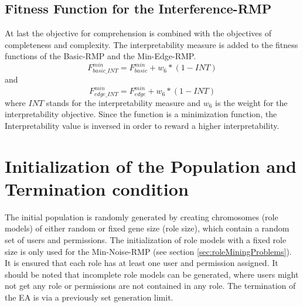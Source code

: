         \subsection{Fitness Function for the Interference-RMP}
        At last the objective for comprehension is combined with the objectives of completeness and complexity. The interpretability measure is added to the fitness functions of the Basic-RMP and the Min-Edge-RMP.        
        \begin{equation}\label{eq:FBasicMin_INT}
	        F_{basic\_INT}^{min} = F_{basic}^{min} + w_6 * (1-INT)
	    \end{equation}	    
	    and	    
	    \begin{equation}\label{eq:FEdgeMin_INT}
		    F_{edge\_INT}^{min} = F_{edge}^{min} + w_6 * (1-INT)
		\end{equation}		
		where $INT$ stands for the interpretability measure and $w_6$ is the weight for the interpretability objective. Since the function is a minimization function, the Interpretability value is inversed in order to reward a higher interpretability.
    
    \section{Initialization of the Population and Termination condition}
    The initial population is randomly generated by creating chromosomes (role models) of either random or fixed gene size (role size), which contain a random set of users and permissions. The initialization of role models with a fixed role size is only used for the Min-Noise-RMP (see section \ref{sec:roleMiningProblems}). It is ensured that each role has at least one user and permission assigned. It should be noted that incomplete role models can be generated, where users might not get any role or permissions are not contained in any role.
    The termination of the EA is via a previously set generation limit.
    
